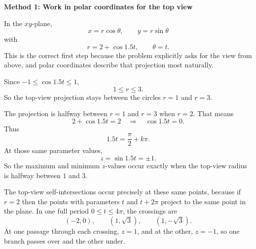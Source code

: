 \documentclass[a4paper,12pt,twocolumn]{article}
\newenvironment{solutionbox}{\begin{framed}}{\end{framed}}
\begin{document}
\begin{solutionbox}
\textbf{Method 1: Work in polar coordinates for the top view}

\begin{steps}
\item In the \(xy\)-plane,
\[
x=r\cos\theta,\qquad y=r\sin\theta
\]
with
\[
r=2+\cos 1.5t,\qquad \theta=t.
\]
This is the correct first step because the problem explicitly asks for the view from above, and polar coordinates describe that projection most naturally.

\item Since \(-1\le \cos 1.5t\le 1\),
\[
1\le r\le 3.
\]
So the top-view projection stays between the circles \(r=1\) and \(r=3\).

\item The projection is halfway between \(r=1\) and \(r=3\) when \(r=2\). That means
\[
2+\cos 1.5t=2
\quad\Longrightarrow\quad
\cos 1.5t=0.
\]
Thus
\[
1.5t=\frac{\pi}{2}+k\pi.
\]
At those same parameter values,
\[
z=\sin 1.5t=\pm1.
\]
So the maximum and minimum \(z\)-values occur exactly when the top-view radius is halfway between \(1\) and \(3\).

\item The top-view self-intersections occur precisely at these same points, because if \(r=2\) then the points with parameters \(t\) and \(t+2\pi\) project to the same point in the plane. In one full period \(0\le t\le 4\pi\), the crossings are
\[
(-2,0),\qquad (1,\sqrt3),\qquad (1,-\sqrt3).
\]
At one passage through each crossing, \(z=1\), and at the other, \(z=-1\), so one branch passes over and the other under.
\end{steps}
\end{solutionbox}
\end{document}
